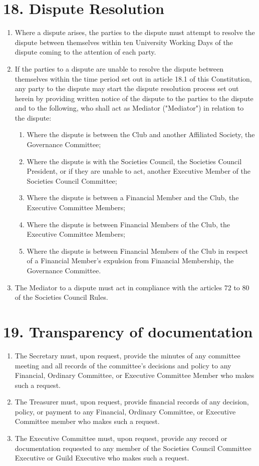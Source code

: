 \documentclass[12pt]{article}
\begin{document}
\section{18. Dispute Resolution}
\begin{enumerate}[label=18.\arabic*]
\item Where a dispute arises, the parties to the dispute must attempt to resolve the dispute between themselves within ten University Working Days of the dispute coming to the attention of each party.
\item If the parties to a dispute are unable to resolve the dispute between themselves within the time period set out in article 18.1 of this Constitution, any party to the dispute may start the dispute resolution process set out herein by providing written notice of the dispute to the parties to the dispute and to the following, who shall act as Mediator ("Mediator") in relation to the dispute:
    \begin{enumerate}[label=18.2.\arabic*]
    \item Where the dispute is between the Club and another Affiliated Society, the Governance Committee;
    \item Where the dispute is with the Societies Council, the Societies Council President, or if they are unable to act, another Executive Member of the Societies Council Committee;
    \item Where the dispute is between a Financial Member and the Club, the Executive Committee Members;
    \item Where the dispute is between Financial Members of the Club, the Executive Committee Members;
    \item Where the dispute is between Financial Members of the Club in respect of a Financial Member's expulsion from Financial Membership, the Governance Committee.
    \end{enumerate}
\item The Mediator to a dispute must act in compliance with the articles 72 to 80 of the Societies Council Rules.
\end{enumerate}

\section{19. Transparency of documentation}
\begin{enumerate}[label=19.\arabic*]
\item The Secretary must, upon request, provide the minutes of any committee meeting and all records of the committee's decisions and policy to any Financial, Ordinary Committee, or Executive Committee Member who makes such a request.
\item The Treasurer must, upon request, provide financial records of any decision, policy, or payment to any Financial, Ordinary Committee, or Executive Committee member who makes such a request.
\item The Executive Committee must, upon request, provide any record or documentation requested to any member of the Societies Council Committee Executive or Guild Executive who makes such a request.
\end{enumerate}
\end{document}

